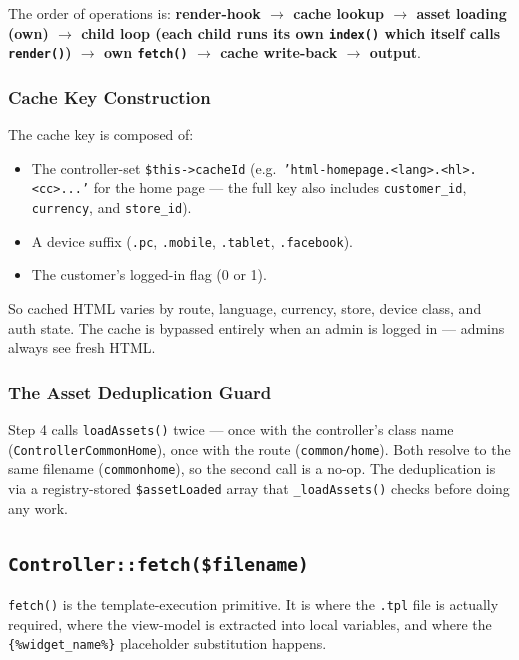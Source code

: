 \documentclass[11pt,a4paper]{article}
\begin{document}
The order of operations is: \textbf{render-hook $\to$ cache lookup
$\to$ asset loading (own) $\to$ child loop (each child runs its own
\texttt{index()} which itself calls \texttt{render()}) $\to$ own
\texttt{fetch()} $\to$ cache write-back $\to$ output}.

\subsubsection{Cache Key Construction}

The cache key is composed of:

\begin{itemize}[leftmargin=1.6em,itemsep=2pt]
  \item The controller-set \texttt{\$this->cacheId} (e.g.\
        \texttt{'html-homepage.<lang>.<hl>.<cc>...'} for the home
        page --- the full key also includes \texttt{customer\_id},
        \texttt{currency}, and \texttt{store\_id}).
  \item A device suffix (\texttt{.pc}, \texttt{.mobile},
        \texttt{.tablet}, \texttt{.facebook}).
  \item The customer's logged-in flag (0 or 1).
\end{itemize}

So cached HTML varies by route, language, currency, store, device
class, and auth state. The cache is bypassed entirely when an
admin is logged in --- admins always see fresh HTML.

\subsubsection{The Asset Deduplication Guard}

Step 4 calls \texttt{loadAssets()} twice --- once with the
controller's class name (\texttt{ControllerCommonHome}), once with
the route (\texttt{common/home}). Both resolve to the same
filename (\texttt{commonhome}), so the second call is a no-op.
The deduplication is via a registry-stored \texttt{\$assetLoaded}
array that \texttt{\_loadAssets()} checks before doing any work.

\subsection{\texttt{Controller::fetch(\$filename)}}

\texttt{fetch()} is the template-execution primitive. It is where
the \texttt{.tpl} file is actually required, where the view-model
is extracted into local variables, and where the
\texttt{\{\%widget\_name\%\}} placeholder substitution happens.
\end{document}
